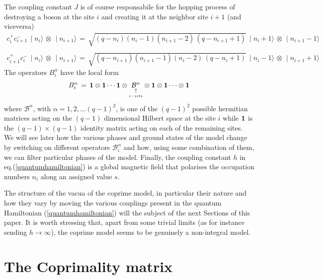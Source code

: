 \documentclass[aps,pra,superscriptaddress]{revtex4}
\newcommand\be            {\begin{equation}}
\newcommand\ee            {\end{equation}}
\renewcommand{\(}{\left(}
\renewcommand{\)}{\right)}
\renewcommand{\[}{\left[}
\renewcommand{\]}{\right]}
\begin{document}
The coupling constant $J$ is of course responsabile for the hopping process of destroying a boson at the site $i$ and creating it at the neighbor site $i+1$ (and viceversa) 
\be
\begin{array}{l}
c_i^+ c_{i+1}^- \,\mid n_i \rangle \,\otimes \,\mid n_{i+1}\rangle \,=\, \sqrt{(q - n_i) (n_i -1)(n_{i+1} -2) \,(q - n_{i+1} +1)} \, 
\mid n_i + 1 \rangle \,\otimes \,\mid n_{i+1} -1 \rangle \\
\\
c_{i+1}^+ c_{i}^- \,\mid n_i \rangle \,\otimes \,\mid n_{i+1}\rangle \,=\, \sqrt{(q - n_{i+1}) (n_{i+1} -1) (n_{i} -2) \,(q - n_{i} +1)} \, 
\mid n_i - 1 \rangle \,\otimes \,\mid n_{i+1} +1 \rangle
\end{array}
\ee 
The operators $B_i^{\alpha}$ have the local form 
\be 
B_i^{\alpha} \,=\, {\bf 1} \otimes {\bf 1} \cdots {\bf 1} \otimes \underset{\underset{i-site}{\uparrow}}{{\mathcal B}^{\alpha}} \otimes {\bf 1} \otimes {\bf 1} \cdots \otimes {\bf 1}  
\ee
where ${\mathcal B}^{\alpha}$, with $\alpha=1,2,\ldots (q-1)^2$, is one of the $(q-1)^2$ possible hermitian matrices acting on the $(q-1)$ dimensional 
Hilbert space at the site $i$ while ${\bf 1}$ is the $(q-1)\times (q-1)$ identity matrix acting on each of the remaining sites. We will see later 
how the various phases and ground states of the model change by switching on different operators ${\mathcal B}_i^\alpha$ and how, using 
some combination of them, we can filter particular phases of the model. Finally, the coupling constant $h$ in eq.(\ref{quantumhamiltonian}) is a global magnetic field that polarises the occupation numbers $n_i$ along an assigned value $s$. 

The structure of the vacua of the coprime model, in particular their nature and how they vary by moving the various couplings present in the quantum Hamiltonian (\ref{quantumhamiltonian}) will the subject of the next Sections of this paper. It is worth stressing that, apart from some trivial limits (as for instance sending $h \rightarrow \infty$), the coprime model seems to be genuinely a non-integral model.   


\section{The Coprimality matrix}\label{coprimality}
\noindent
\end{document}
